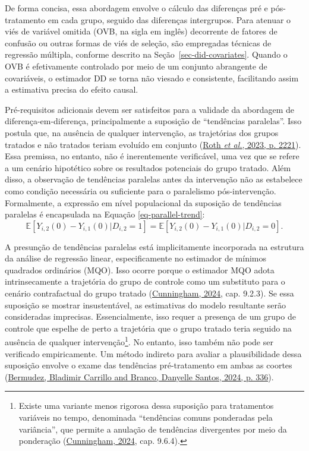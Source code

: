\documentclass[12pt, a4paper, twoside]{article}
\numberwithin{equation}{subsection} %
\begin{document}
De forma concisa, essa abordagem envolve o cálculo das diferenças pré e
pós-tratamento em cada grupo, seguido das diferenças intergrupos. Para
atenuar o viés de variável omitida (OVB, na sigla em inglês) decorrente
de fatores de confusão ou outras formas de viés de seleção, são
empregadas técnicas de regressão múltipla, conforme descrito na
Seção~\ref{sec-did-covariates}. Quando o OVB é efetivamente controlado
por meio de um conjunto abrangente de covariáveis, o estimador DD se
torna não viesado e consistente, facilitando assim a estimativa precisa
do efeito causal.

Pré-requisitos adicionais devem ser satisfeitos para a validade da
abordagem de diferença-em-diferença, principalmente a suposição de
``tendências paralelas''. Isso postula que, na ausência de qualquer
intervenção, as trajetórias dos grupos tratados e não tratados teriam
evoluído em conjunto (\protect\hyperlink{ref-roth_whats_2023}{Roth
\emph{et al.}, 2023, p. 2221}). Essa premissa, no entanto, não é
inerentemente verificável, uma vez que se refere a um cenário hipotético
sobre os resultados potenciais do grupo tratado. Além disso, a
observação de tendências paralelas antes da intervenção não as
estabelece como condição necessária ou suficiente para o paralelismo
pós-intervenção. Formalmente, a expressão em nível populacional da
suposição de tendências paralelas é encapsulada na Equação
\eqref{eq-parallel-trend}: \begin{equation}
\label{eq-parallel-trend}
   \mathbb{E}[Y_{i,2}(0) - Y_{i,1}(0) | D_{i,2} = 1] = \mathbb{E}[Y_{i,2}(0) - Y_{i,1}(0) | D_{i,2} = 0].
\end{equation}

A presunção de tendências paralelas está implicitamente incorporada na
estrutura da análise de regressão linear, especificamente no estimador
de mínimos quadrados ordinários (MQO). Isso ocorre porque o estimador
MQO adota intrinsecamente a trajetória do grupo de controle como um
substituto para o cenário contrafactual do grupo tratado
(\protect\hyperlink{ref-cunningham_causal_2024}{Cunningham, 2024}, cap.
9.2.3). Se essa suposição se mostrar insustentável, as estimativas do
modelo resultante serão consideradas imprecisas. Essencialmente, isso
requer a presença de um grupo de controle que espelhe de perto a
trajetória que o grupo tratado teria seguido na ausência de qualquer
intervenção\footnote{Existe uma variante menos rigorosa dessa suposição
  para tratamentos variáveis no tempo, denominada ``tendências comuns
  ponderadas pela variância'', que permite a anulação de tendências
  divergentes por meio da ponderação
  (\protect\hyperlink{ref-cunningham_causal_2024}{Cunningham, 2024},
  cap. 9.6.4).}. No entanto, isso também não pode ser verificado
empiricamente. Um método indireto para avaliar a plausibilidade dessa
suposição envolve o exame das tendências pré-tratamento em ambas as
coortes
(\protect\hyperlink{ref-bladimir_carrillo_bermudez_o_2024}{Bermudez,
Bladimir Carrillo and Branco, Danyelle Santos, 2024, p. 336}).
\end{document}
